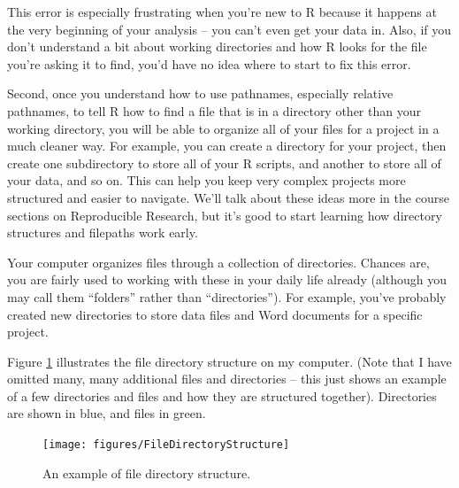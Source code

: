 \documentclass[]{book}
\theoremstyle{definition}
\theoremstyle{definition}
\theoremstyle{definition}
\theoremstyle{remark}
\begin{document}
This error is especially frustrating when you're new to R because it
happens at the very beginning of your analysis -- you can't even get
your data in. Also, if you don't understand a bit about working
directories and how R looks for the file you're asking it to find, you'd
have no idea where to start to fix this error.

Second, once you understand how to use pathnames, especially relative
pathnames, to tell R how to find a file that is in a directory other
than your working directory, you will be able to organize all of your
files for a project in a much cleaner way. For example, you can create a
directory for your project, then create one subdirectory to store all of
your R scripts, and another to store all of your data, and so on. This
can help you keep very complex projects more structured and easier to
navigate. We'll talk about these ideas more in the course sections on
Reproducible Research, but it's good to start learning how directory
structures and filepaths work early.

Your computer organizes files through a collection of directories.
Chances are, you are fairly used to working with these in your daily
life already (although you may call them ``folders'' rather than
``directories''). For example, you've probably created new directories
to store data files and Word documents for a specific project.

Figure \ref{fig:filedirstructure} illustrates the file directory
structure on my computer. (Note that I have omitted many, many
additional files and directories -- this just shows an example of a few
directories and files and how they are structured together). Directories
are shown in blue, and files in green.

\begin{figure}

{\centering \texttt{[image: figures/FileDirectoryStructure]} 

}

\caption{An example of file directory structure.}\label{fig:filedirstructure}
\end{figure}
\end{document}
